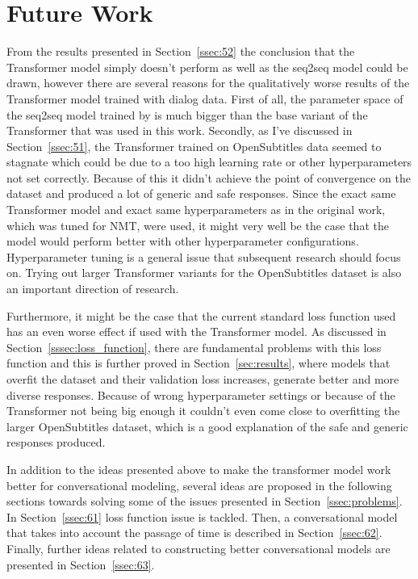 \documentclass[12pt]{article}
\begin{document}
\newpage\section{Future Work} \label{sec:future}
From the results presented in Section~\ref{ssec:52} the conclusion that the Transformer model simply doesn't perform as well as the seq2seq model could be drawn, however there are several reasons for the qualitatively worse results of the Transformer model trained with dialog data. First of all, the parameter space of the seq2seq model trained by \cite{Vinyals:2015} is much bigger than the base variant of the Transformer that was used in this work. Secondly, as I've discussed in Section~\ref{ssec:51}, the Transformer trained on OpenSubtitles data seemed to stagnate which could be due to a too high learning rate or other hyperparameters not set correctly. Because of this it didn't achieve the point of convergence on the dataset and produced a lot of generic and safe responses. Since the exact same Transformer model and exact same hyperparameters as in the original work, which was tuned for NMT, were used, it might very well be the case that the model would perform better with other hyperparameter configurations. Hyperparameter tuning is a general issue that subsequent research should focus on. Trying out larger Transformer variants for the OpenSubtitles dataset is also an important direction of research.

Furthermore, it might be the case that the current standard loss function used has an even worse effect if used with the Transformer model. As discussed in Section~\ref{sssec:loss_function}, there are fundamental problems with this loss function and this is further proved in Section~\ref{sec:results}, where models that overfit the dataset and their validation loss increases, generate better and more diverse responses. Because of wrong hyperparameter settings or because of the Transformer not being big enough it couldn't even come close to overfitting the larger OpenSubtitles dataset, which is a good explanation of the safe and generic responses produced.

In addition to the ideas presented above to make the transformer model work better for conversational modeling, several ideas are proposed in the following sections towards solving some of the issues presented in Section~\ref{ssec:problems}. In Section~\ref{ssec:61} loss function issue is tackled. Then, a conversational model that takes into account the passage of time is described in Section~\ref{ssec:62}. Finally, further ideas related to constructing better conversational models are presented in Section~\ref{ssec:63}.
\end{document}
